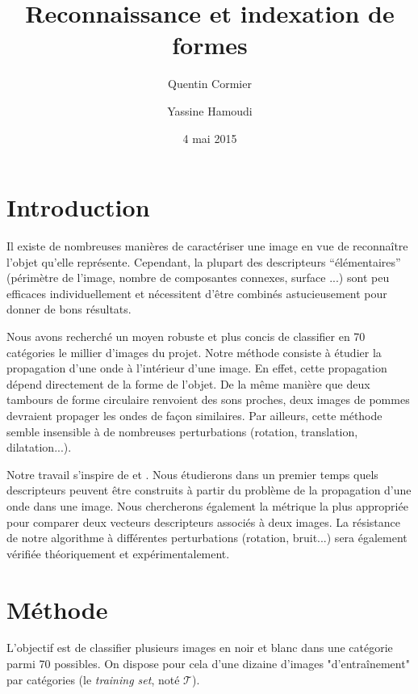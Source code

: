 \documentclass[a4paper,10pt]{article} %
\title{Reconnaissance et indexation de formes}
\author{Quentin Cormier \and Yassine Hamoudi}
\date{4 mai 2015}
\theoremstyle{definition} %
\begin{document}
\maketitle

\tableofcontents


\section{Introduction}

Il existe de nombreuses manières de caractériser une image en vue de reconnaître l'objet qu'elle représente. Cependant, la plupart des descripteurs ``élémentaires'' (périmètre de l'image, nombre de composantes connexes, surface ...) sont peu efficaces individuellement et nécessitent d'être combinés astucieusement pour donner de bons résultats.

Nous avons recherché un moyen robuste et plus concis de classifier en 70 catégories le millier d'images du projet. Notre méthode consiste à étudier la propagation d'une onde à l'intérieur d'une image. En effet, cette propagation dépend directement de la forme de l'objet. De la même manière que deux tambours de forme circulaire renvoient des sons proches, deux images de pommes devraient propager les ondes de façon similaires. Par ailleurs, cette méthode semble insensible à de nombreuses perturbations (rotation, translation, dilatation...).

Notre travail s'inspire de \cite{Zuliani04} et \cite{KhabouHR07}. Nous étudierons dans un premier temps quels descripteurs peuvent être construits à partir du problème de la propagation d'une onde dans une image. Nous chercherons également la métrique la plus appropriée pour comparer deux vecteurs descripteurs associés à deux images. La résistance de notre algorithme à différentes perturbations (rotation, bruit...) sera également vérifiée théoriquement et expérimentalement.

\section{Méthode}

L'objectif est de classifier plusieurs images en noir et blanc dans une catégorie parmi 70 possibles.
On dispose pour cela d'une dizaine d'images "d'entraînement" par catégories (le \textit{training set}, noté $\mathcal{T}$).
\end{document}
